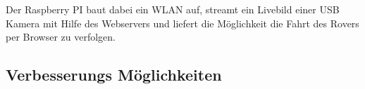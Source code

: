 Der Raspberry PI baut dabei ein WLAN auf, streamt ein Livebild einer USB Kamera mit Hilfe des Webservers und liefert die Möglichkeit die Fahrt des Rovers per Browser zu verfolgen.

\subsection{Verbesserungs Möglichkeiten}
